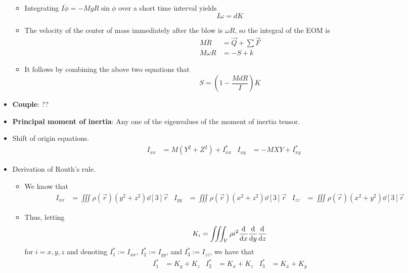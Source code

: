 \documentclass[../notes.tex]{subfiles}
\begin{document}
\begin{itemize}
\begin{itemize}
        \item Integrating $I\ddot{\phi}=-MgR\sin\phi$ over a short time interval yields
        \begin{equation*}
            I\omega = dK
        \end{equation*}
        \item The velocity of the center of mass immediately after the blow is $\omega R$, so the integral of the EOM is
        \begin{align*}
            M\dot{R} &= \vec{Q}+\sum\vec{F}\\
            M\omega R &= -S+k
        \end{align*}
        \item It follows by combining the above two equations that
        \begin{equation*}
            S = \left(1-\frac{MdR}{I} \right)K
        \end{equation*}
    \end{itemize}
    \item \textbf{Couple}: ??
    \item \textbf{Principal moment of inertia}: Any one of the eigenvalues of the moment of inertia tensor.
    \item Shift of origin equations.
    \begin{align*}
        I_{xx} &= M(Y^2+Z^2)+I_{xx}^*&
        I_{xy} &= -MXY+I_{xy}^*
    \end{align*}
    \item Derivation of Routh's rule.
    \begin{itemize}
        \item We know that
        \begin{align*}
            I_{xx} &= \iiint\rho(\vec{r})(y^2+z^2)\dd[3]{\vec{r}}&
            I_{yy} &= \iiint\rho(\vec{r})(x^2+z^2)\dd[3]{\vec{r}}&
            I_{zz} &= \iiint\rho(\vec{r})(x^2+y^2)\dd[3]{\vec{r}}
        \end{align*}
        \item Thus, letting
        \begin{equation*}
            K_i = \iiint_V\rho i^2\dv{x}\dv{y}\dv{z}
        \end{equation*}
        for $i=x,y,z$ and denoting $I_1^*:=I_{xx}$, $I_2^*:=I_{yy}$, and $I_3^*:=I_{zz}$, we have that
        \begin{align*}
            I_1^* &= K_y+K_z&
            I_2^* &= K_x+K_z&
            I_3^* &= K_x+K_y
        \end{align*}

\end{itemize}
\end{itemize}
\end{document}
